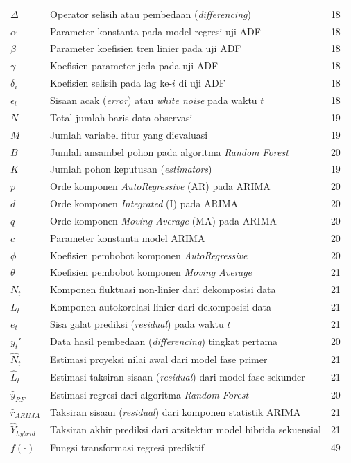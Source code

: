 \begin{longtable}{@{} l >{\raggedright\arraybackslash}p{6.5cm} c @{}}
$\Delta$ & Operator selisih atau pembedaan (\textit{differencing}) & 18 \\
$\alpha$ & Parameter konstanta pada model regresi uji ADF & 18 \\
$\beta$ & Parameter koefisien tren linier pada uji ADF & 18 \\
$\gamma$ & Koefisien parameter jeda pada uji ADF & 18 \\
$\delta_i$ & Koefisien selisih pada lag ke-$i$ di uji ADF & 18 \\
$\epsilon_t$ & Sisaan acak (\textit{error}) atau \textit{white noise} pada waktu $t$ & 18 \\[1ex]


$N$ & Total jumlah baris data observasi & 19 \\
$M$ & Jumlah variabel fitur yang dievaluasi & 19 \\
$B$ & Jumlah ansambel pohon pada algoritma \textit{Random Forest} & 20 \\
$K$ & Jumlah pohon keputusan (\textit{estimators}) & 19 \\
$p$ & Orde komponen \textit{AutoRegressive} (AR) pada ARIMA & 20 \\
$d$ & Orde komponen \textit{Integrated} (I) pada ARIMA & 20 \\
$q$ & Orde komponen \textit{Moving Average} (MA) pada ARIMA & 20 \\
$c$ & Parameter konstanta model ARIMA & 20 \\
$\phi$ & Koefisien pembobot komponen \textit{AutoRegressive} & 20 \\
$\theta$ & Koefisien pembobot komponen \textit{Moving Average} & 21 \\
$N_t$ & Komponen fluktuasi non-linier dari dekomposisi data & 21 \\
$L_t$ & Komponen autokorelasi linier dari dekomposisi data & 21 \\
$e_t$ & Sisa galat prediksi (\textit{residual}) pada waktu $t$ & 21 \\
$y_t'$ & Data hasil pembedaan (\textit{differencing}) tingkat pertama & 20 \\
$\hat{N}_t$ & Estimasi proyeksi nilai awal dari model fase primer & 21 \\
$\hat{L}_t$ & Estimasi taksiran sisaan (\textit{residual}) dari model fase sekunder & 21 \\
$\hat{y}_{RF}$ & Estimasi regresi dari algoritma \textit{Random Forest} & 20 \\
$\hat{r}_{ARIMA}$ & Taksiran sisaan (\textit{residual}) dari komponen statistik ARIMA & 21 \\
$\hat{Y}_{hybrid}$ & Taksiran akhir prediksi dari arsitektur model hibrida sekuensial & 21 \\
$f(\cdot)$ & Fungsi transformasi regresi prediktif & 49 \\[1ex]


\end{longtable}
